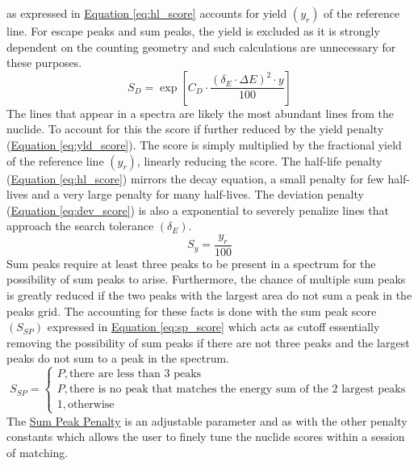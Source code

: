 \documentclass[12pt,report,justified]{SANDreport}
\begin{document}
as expressed in \hyperref[eq:hl_score]{Equation \ref{eq:hl_score}} accounts for yield  \(\left( y_r \right)\) of
 the reference line. For escape peaks and sum peaks, the yield is excluded as it is strongly dependent on
the counting geometry and such calculations are unnecessary for these purposes.
\begin{equation}
S_D = \exp{\left[ C_D \cdot \frac{\left(\delta_E \cdot \Delta E \right)^2 \cdot y}{100} \right]}
\label{eq:dev_score}
\end{equation}
The lines that appear in a spectra are likely the most abundant lines from the nuclide. To account for
this the score if further reduced by the yield penalty (\hyperref[eq:yld_score]{Equation \ref{eq:yld_score}}).
The score is simply multiplied by the fractional yield of the reference line \(\left( y_r\right)\), linearly
reducing the score. The half-life penalty (\hyperref[eq:hl_score]{Equation \ref{eq:hl_score}}) mirrors the
decay equation, a small penalty for few half-lives and a very large penalty for many half-lives. The deviation
penalty (\hyperref[eq:dev_score]{Equation \ref{eq:dev_score}}) is also a exponential to severely penalize
lines that approach the search tolerance \(\left( \delta _E \right)\).
\begin{equation}
S_y = \frac{y_r}{100}
\label{eq:yld_score}
\end{equation}
Sum peaks require at least three peaks to be present in a spectrum for the possibility of sum peaks
to arise. Furthermore, the chance of multiple sum peaks is greatly reduced if the two peaks with
the largest area do not sum a peak in the peaks grid. The accounting for these facts is done with
the sum peak score \(\left( S_{SP} \right)\) expressed in \hyperref[eq:sp_score]{Equation \ref{eq:sp_score}}
which acts as cutoff essentially removing the possibility of sum peaks if there are not three peaks and the
largest peaks do not sum to a peak in the spectrum.
\begin{equation}
S_{SP} =
\begin{cases}
P, \text{there are less than 3 peaks} \\
P, \text{there is no peak that matches the energy sum of the 2 largest peaks} \\
1, \text{otherwise}
\end{cases}
\label{eq:sp_score}
\end{equation}
The \hyperref[itm:sm_peak_pen]{Sum Peak Penalty} is an adjustable parameter and as with the other
penalty constants which allows the user to finely tune the nuclide scores within a session of matching.
\end{document}
